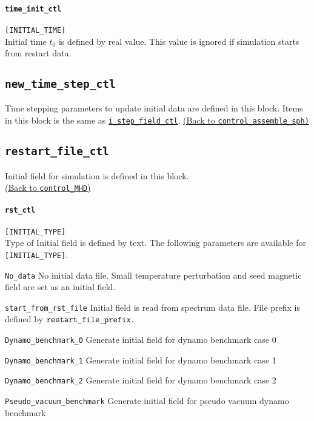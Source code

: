 \paragraph{\tt time\_init\_ctl}
\label{href_t:time_init_ctl}
\verb|[INITIAL_TIME]| \\
Initial time $t_{0}$ is defined by real value. This value is ignored if simulation starts from restart data.

\subsection{\tt new\_time\_step\_ctl}
\label{href_t:new_time_step_ctl}
Time stepping parameters to update initial data are defined in this block. Items in this block is the same as \hyperref[href_t:i_step_field_ctl]{\tt i\_step\_field\_ctl}.
\hyperref[href_i:new_time_step_ctl]{(Back to {\tt control\_assemble\_sph)}}


\subsection{\tt restart\_file\_ctl}
\label{href_t:restart_file_ctl}
Initial field for simulation is defined in this block.\\
\hyperref[href_t:restart_file_prefix]{(Back to {\tt control\_MHD})}

\paragraph{\tt rst\_ctl}
\label{href_t:rst_ctl}
\verb|[INITIAL_TYPE]| \\
Type of Initial field is defined by text. The following parameters are available for \verb|[INITIAL_TYPE]|.
%
\begin{description}
\item{\tt No\_data}  No initial data file. Small temperature perturbation and seed magnetic field are set as an initial field.
\item{\tt start\_from\_rst\_file} Initial field is read from spectrum data file. File prefix is defined by \hyperref[href_t:restart_file_prefix]{$\mbox{\tt restart\_file\_prefix}$}.
\item{\tt Dynamo\_benchmark\_0}   Generate initial field for dynamo benchmark case 0
\item{\tt Dynamo\_benchmark\_1}   Generate initial field for dynamo benchmark case 1
\item{\tt Dynamo\_benchmark\_2}   Generate initial field for dynamo benchmark case 2
\item{\tt Pseudo\_vacuum\_benchmark} Generate initial field for pseudo vacuum dynamo benchmark
\end{description}
%

